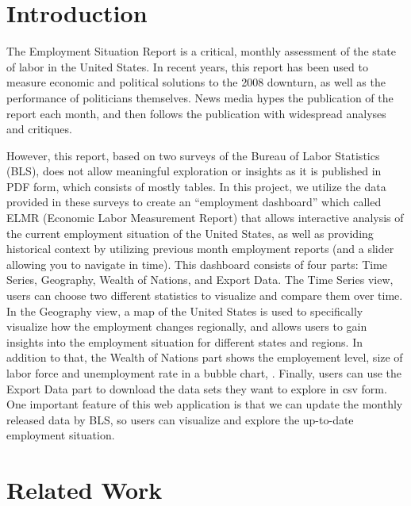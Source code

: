 \documentclass{sigchi}
\begin{document}


\section{Introduction}
The Employment Situation Report is a critical, monthly assessment of the state of labor in the United States. In recent years, this report has been used to measure economic and political solutions to the 2008 downturn, as well as the performance of politicians themselves. News media hypes the publication of the report each month, and then follows the publication with widespread analyses and critiques.

However, this report, based on two surveys of the Bureau of Labor Statistics (BLS), does not allow meaningful exploration or insights as it is published in PDF form, which consists of mostly tables. In this project, we utilize the data provided in these surveys to create an ``employment dashboard'' which called ELMR (Economic Labor Measurement Report) that allows interactive analysis of the current employment situation of the United States, as well as providing historical context by utilizing previous month employment reports (and a slider allowing you to navigate in time). This dashboard consists of four parts: Time Series, Geography, Wealth of Nations, and Export Data. The Time Series view, users can choose two different statistics to visualize and compare them over time. In the Geography view, a map of the United States is used to specifically visualize how the employment changes regionally, and allows users to gain insights into the employment situation for different states and regions. In addition to that, the Wealth of Nations part shows the employement level, size of labor force and unemployment rate in a bubble chart, . Finally, users can use the Export Data part to download the data sets they want to explore in csv form. One important feature of this web application is that we can update the monthly released data by BLS, so users can visualize and explore the up-to-date employment situation.


\section{Related Work}
\end{document}
